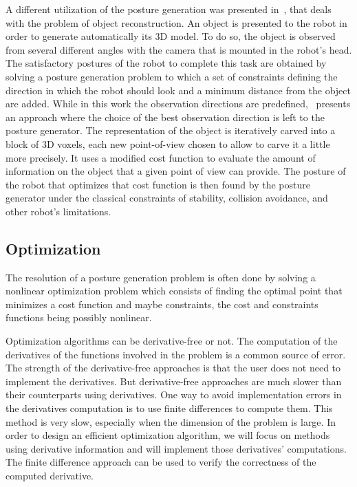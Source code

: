 A different utilization of the posture generation was presented in~\cite{stasse:humanoids:2007}, that deals with the problem of object reconstruction.
An object is presented to the robot in order to generate automatically its 3D model.
To do so, the object is observed from several different angles with the camera that is mounted in the robot's head.
The satisfactory postures of the robot to complete this task are obtained by solving a posture generation problem to which a set of constraints defining the direction in which the robot should look and a minimum distance from the object are added.
While in this work the observation directions are predefined,~\cite{foissotte:humanoids:2008} presents an approach where the choice of the best observation direction is left to the posture generator.
The representation of the object is iteratively carved into a block of 3D voxels, each new point-of-view chosen to allow to carve it a little more precisely.
It uses a modified cost function to evaluate the amount of information on the object that a given point of view can provide.
The posture of the robot that optimizes that cost function is then found by the posture generator under the classical constraints of stability, collision avoidance, and other robot's limitations.


\subsection{Optimization}
\label{sub:optimization}

The resolution of a posture generation problem is often done by solving a nonlinear optimization problem which consists of finding the optimal point that minimizes a cost function and maybe constraints, the cost and constraints functions being possibly nonlinear.

Optimization algorithms can be derivative-free or not.
The computation of the derivatives of the functions involved in the problem is a common source of error.
The strength of the derivative-free approaches is that the user does not need to implement the derivatives.
But derivative-free approaches are much slower than their counterparts using derivatives.
One way to avoid implementation errors in the derivatives computation is to use finite differences to compute them.
This method is very slow, especially when the dimension of the problem is large.
In order to design an efficient optimization algorithm, we will focus on methods using derivative information and will implement those derivatives' computations.
The finite difference approach can be used to verify the correctness of the computed derivative.

